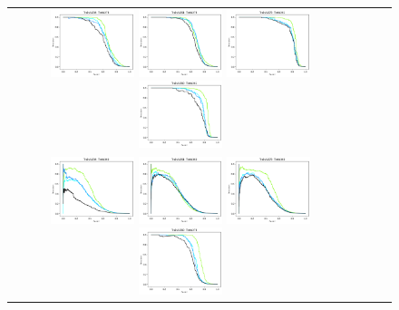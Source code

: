 \begin{figure}[h!]
\begin{tabular}{cccc}
  \includegraphics[width=0.25\textwidth]{Kap8/best-train=b234test=b278.png}  
  \includegraphics[width=0.25\textwidth]{Kap8/best-train=b261test=b278.png}
  \includegraphics[width=0.25\textwidth]{Kap8/best-train=b278test=b261.png} 
   \includegraphics[width=0.25\textwidth]{Kap8/best-train=b360test=b261.png} \\
   
     \includegraphics[width=0.25\textwidth]{Kap8/best-train=b234test=b360.png}  
  \includegraphics[width=0.25\textwidth]{Kap8/best-train=b261test=b360.png}
  \includegraphics[width=0.25\textwidth]{Kap8/best-train=b278test=b360.png} 
   \includegraphics[width=0.25\textwidth]{Kap8/best-train=b360test=b278.png} \\


\end{tabular}
\end{figure}
